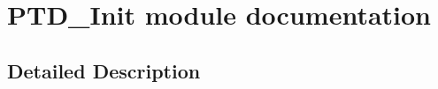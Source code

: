 \hypertarget{group___p_t_d___init__module}{}\section{P\+T\+D\+\_\+\+Init module documentation}
\label{group___p_t_d___init__module}


\subsection{Detailed Description}
